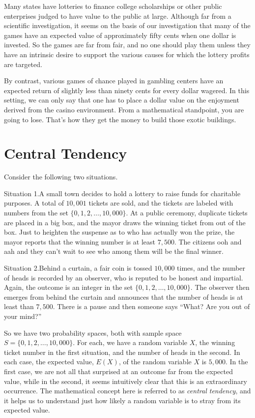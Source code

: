 \begin{example}
Many states have lotteries to finance college scholarships
or other public enterprises judged to have value to the public
at large.  Although far from a scientific investigation, it seems on
the basis of our investigation that many of the games have an 
expected value of approximately fifty cents when one
dollar is invested.  So the games are far from fair, and no
one should play them unless they have an intrinsic desire
to support the various causes for which the lottery profits
are targeted.

By contrast, various games of chance played in gambling
centers have an expected return of slightly less than ninety
cents for every dollar wagered.  In this setting, we can
only say that one has to place a dollar value on the 
enjoyment derived from the casino environment.  From a mathematical
standpoint, you are going to lose.  That's how they get the money
to build those exotic buildings.
\end{example}

\section{Central Tendency}\label{s:probability:central-tendency}

Consider the following two situations.

Situation 1.\quad A small town decides to hold a lottery to raise funds for
charitable purposes.  A total of $10,001$ tickets are sold, and the
tickets are labeled with numbers from the set $\{0,1,2,\dots,10,000\}$. 
At a public ceremony, duplicate tickets are placed in a big box, and
the mayor draws the winning ticket from out of the box.  Just to heighten 
the suspense as to who has actually won the prize, the mayor reports that 
the winning number is at least $7,500$.  The citizens ooh and aah and they
can't wait to see who among them will be the final winner.

Situation 2.\quad Behind a curtain, a fair coin is tossed $10,000$ times, 
and the number of heads is recorded by an observer, who is reputed to
be honest and impartial.   Again, the outcome is an integer in the 
set $\{0,1,2,\dots,10,000\}$.  The observer then emerges from behind 
the curtain and announces that the number of heads is at least than $7,500$.  
There is a pause and then someone says ``What?  Are you out of your mind?''

So we have two probability spaces, both with sample space
$S=\{0,1,2,\dots,10,000\}$.  For each, we have a random variable $X$,
the winning ticket number in the first situation, and the number of
heads in the second.  In each case, the expected value, $E(X)$, of the
random variable $X$ is $5,000$.  In the first case, we are not all
that surprised at an outcome far from the expected value, while in the
second, it seems intuitively clear that this is an extraordinary
occurrence.  The mathematical concept here is referred to as
\textit{central tendency}, and it helps us to understand just how
likely a random variable is to stray from its expected value.

